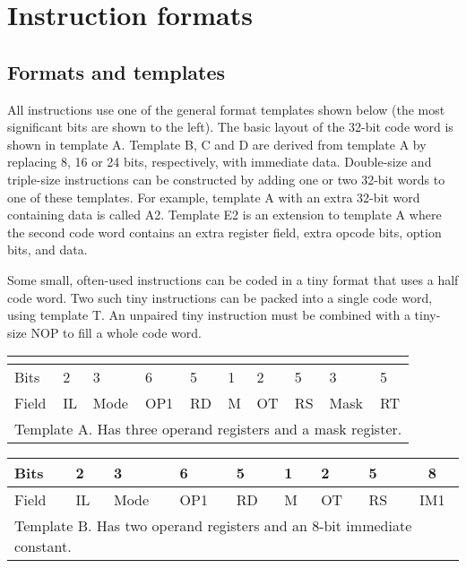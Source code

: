 \documentclass[forwardcom.tex]{subfiles}
\begin{document}
\RaggedRight

\chapter{Instruction formats}
\section{Formats and templates}
All instructions use one of the general format templates shown below (the most significant bits are shown to the left). The basic layout of the 32-bit code word is shown in template A. Template B, C and D are derived from template A by replacing 8, 16 or 24 bits, respectively, with immediate data. Double-size and triple-size instructions can be constructed by adding one or two 32-bit words to one of these templates. For example, template A with an extra 32-bit word containing data is called A2. Template E2 is an extension to template A where the second code word contains an extra register field, extra opcode bits, option bits, and data.
\vspace{2mm}

Some small, often-used instructions can be coded in a tiny format that uses a half code word. Two such tiny instructions can be packed into a single code word, using template T. An unpaired tiny instruction must be combined with a tiny-size NOP to fill a whole code word.

\begin{longtable}[l]
{|p{7mm}|p{7mm}|p{7mm}|p{7mm}|p{7mm}|p{7mm}|p{7mm}|p{7mm}|p{7mm}|p{7mm}|}
\endfirsthead
 \label{table:templateA} \\
\endhead
\hline
 Bits & 2 & 3 & 6 & 5 & 1 & 2 & 5 & 3 & 5 \\
\hline
Field & IL & Mode & OP1 & RD & M & OT & RS & Mask & RT \\
\hline
\multicolumn{10}{|l|}{
Template A. Has three operand registers and a mask register.} \\
\hline
\end{longtable}

\begin{longtable}[l]{|p{7mm}|p{7mm}|p{7mm}|p{7mm}|p{7mm}|p{7mm}|p{7mm}|p{7mm}|p{7mm}|p{7mm}|}
\endfirsthead
\label{table:templateB}
\endhead
\hline
  Bits & 2 & 3 & 6 & 5 & 1 & 2 & 5 & 
  \multicolumn{2}{|c|}{ 8 } \\
\hline
Field & IL & Mode & OP1 & RD & M & OT & RS & 
  \multicolumn{2}{|c|}{ IM1 } \\
\hline
  \multicolumn{10}{|p{108mm}|}{
Template B. Has two operand registers and an 8-bit immediate constant.}  \\
\hline
\end{longtable}
\end{document}
